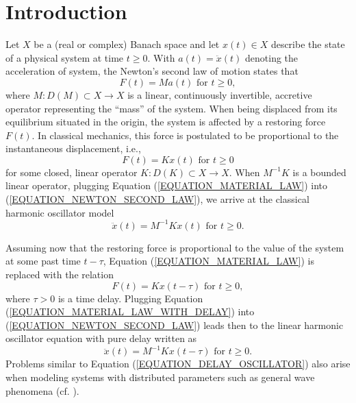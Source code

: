 \documentclass[12pt]{article}
\numberwithin{equation}{section}
\numberwithin{equation}{section}
\begin{document}
\section{Introduction}
Let $X$ be a (real or complex) Banach space and let $x(t) \in X$ describe the state of a physical system at time $t \geq 0$. 
With $a(t) = \ddot{x}(t)$ denoting the acceleration of system, the Newton's second law of motion states that
\begin{equation}
	F(t) = Ma(t) \text{ for } t \geq 0, \label{EQUATION_NEWTON_SECOND_LAW}
\end{equation}
where $M \colon D(M) \subset X \to X$ is a linear, continuously invertible, accretive operator
representing the ``mass'' of the system. 
When being displaced from its equilibrium situated in the origin, the system is affected by a restoring force $F(t)$. 
In classical mechanics, this force is postulated to be proportional to the instantaneous displacement, i.e.,
\begin{equation}
	F(t) = Kx(t) \text{ for } t \geq 0 \label{EQUATION_MATERIAL_LAW}
\end{equation}
for some closed, linear operator $K \colon D(K) \subset X \to X$.
When $M^{-1} K$ is a bounded linear operator,
plugging Equation (\ref{EQUATION_MATERIAL_LAW}) into (\ref{EQUATION_NEWTON_SECOND_LAW}),
we arrive at the classical harmonic oscillator model
\begin{equation}
	\ddot{x}(t) = M^{-1} K x(t) \text{ for } t \geq 0. \label{EQUATION_HARMONIC_OSCILLATOR}
\end{equation}

Assuming now that the restoring force is proportional to the value of the system at some past time $t - \tau$, 
Equation (\ref{EQUATION_MATERIAL_LAW}) is replaced with the relation
\begin{equation}
	F(t) = K x(t - \tau) \text{ for } t \geq 0, \label{EQUATION_MATERIAL_LAW_WITH_DELAY}
\end{equation}
where $\tau > 0$ is a time delay. Plugging Equation (\ref{EQUATION_MATERIAL_LAW_WITH_DELAY}) into (\ref{EQUATION_NEWTON_SECOND_LAW}) 
leads then to the linear harmonic oscillator equation with pure delay written as
\begin{equation}
	\ddot{x}(t) = M^{-1} K x(t - \tau) \text{ for } t \geq 0. \label{EQUATION_DELAY_OSCILLATOR}
\end{equation}
Problems similar to Equation (\ref{EQUATION_DELAY_OSCILLATOR}) also arise when modeling systems 
with distributed parameters such as general wave phenomena (cf. \cite{KhuPoAzi2013}).
\end{document}
